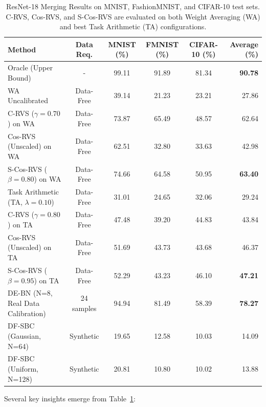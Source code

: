 \documentclass{article}
\theoremstyle{plain}
\theoremstyle{definition}
\theoremstyle{remark}
\begin{document}
\begin{table}[t]
\caption{ResNet-18 Merging Results on MNIST, FashionMNIST, and CIFAR-10 test sets. C-RVS, Cos-RVS, and S-Cos-RVS are evaluated on both Weight Averaging (WA) and best Task Arithmetic (TA) configurations.}
\label{tab:resnet_results}
\begin{center}
\begin{small}
\begin{sc}
\begin{tabular}{lccccr}
\toprule
Method & Data Req. & MNIST (\%) & FMNIST (\%) & CIFAR-10 (\%) & Average (\%) \\
\midrule
Oracle (Upper Bound) & - & 99.11 & 91.89 & 81.34 & \textbf{90.78} \\
\midrule
WA Uncalibrated & Data-Free & 39.14 & 21.23 & 23.21 & 27.86 \\
C-RVS ($\gamma=0.70$) on WA & Data-Free & 73.87 & 65.49 & 48.57 & 62.64 \\
Cos-RVS (Unscaled) on WA & Data-Free & 62.51 & 32.80 & 33.63 & 42.98 \\
S-Cos-RVS ($\beta=0.80$) on WA & Data-Free & 74.66 & 64.58 & 50.95 & \textbf{63.40} \\
\midrule
Task Arithmetic (TA, $\lambda=0.10$) & Data-Free & 31.01 & 24.65 & 32.06 & 29.24 \\
C-RVS ($\gamma=0.80$) on TA & Data-Free & 47.48 & 39.20 & 44.83 & 43.84 \\
Cos-RVS (Unscaled) on TA & Data-Free & 51.69 & 43.73 & 43.68 & 46.37 \\
S-Cos-RVS ($\beta=0.95$) on TA & Data-Free & 52.29 & 43.23 & 46.10 & \textbf{47.21} \\
\midrule
DE-BN (N=8, Real Data Calibration) & 24 samples & 94.94 & 81.49 & 58.39 & \textbf{78.27} \\
DF-SBC (Gaussian, N=64) & Synthetic & 19.65 & 12.58 & 10.03 & 14.09 \\
DF-SBC (Uniform, N=128) & Synthetic & 20.81 & 10.80 & 10.02 & 13.88 \\
\bottomrule
\end{tabular}
\end{sc}
\end{small}
\end{center}
\end{table}

Several key insights emerge from Table~\ref{tab:resnet_results}:
\end{document}
